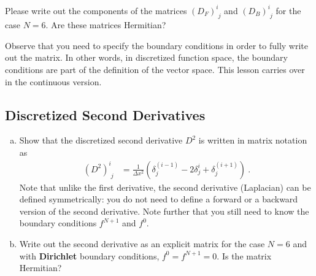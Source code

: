 \documentclass[12pt]{article}
\numberwithin{equation}{section}    %
\renewcommand{\vec}[1]{\mathbf{#1}} %
\begin{document}
Please write out the components of the matrices $(D_F)^i_{\phantom{i}j}$ and $(D_B)^i_{\phantom{i}j}$ for the case $N=6$. Are these matrices Hermitian?

Observe that you need to specify the boundary conditions in order to fully write out the matrix. In other words, in discretized function space, the boundary conditions are part of the definition of the vector space. This lesson carries over in the continuous version. 



\subsection{Discretized Second Derivatives}



\begin{enumerate}[(a)]
	\item Show that the discretized second derivative $D^2$ is written in matrix notation as
\begin{align}
	\left(D^2\right)^i_{\phantom{i}j}
	&= 
	\frac{1}{\Delta x^2}
	\left(
	\delta_j^{(i-1)}
	- 2 \delta_j^{i}
	+
	\delta_j^{(i+1)}
	\right) \ .
	\label{eq:D2}
\end{align}
Note that unlike the first derivative, the second derivative (Laplacian) can be defined symmetrically: you do not need to define a forward or a backward version of the second derivative. Note further that you still need to know the boundary conditions $f^{N+1}$ and $f^0$.

\item Write out the second derivative as an explicit matrix for the case $N=6$ and with \textbf{Dirichlet} boundary conditions, $f^0 = f^{N+1} = 0$. Is the matrix Hermitian?


\end{enumerate}
\end{document}

